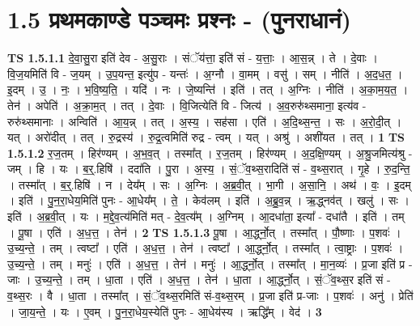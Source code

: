 \documentclass[17pt]{extarticle}
\begin{document}
\section*{ 1.5     प्रथमकाण्डे पञ्चमः प्रश्नः - (पुनराधानं) }
                                \textbf{ TS 1.5.1.1} \newline
                  दे॒वा॒सु॒रा इति॑ देव - अ॒सु॒राः । संॅय॑त्ता॒ इति॑ सं - य॒त्ताः॒ । आ॒स॒न्न् । ते । दे॒वाः । वि॒ज॒यमिति॑ वि - ज॒यम् । उ॒प॒यन्त॒ इत्यु॑प - यन्तः॑ । अ॒ग्नौ । वा॒मम् । वसु॑ । सम् । नीति॑ । अ॒द॒ध॒त॒ । इ॒दम् । उ॒ । नः॒ । भ॒वि॒ष्य॒ति॒ । यदि॑ । नः । जे॒ष्यन्ति॑ । इति॑ । तत् । अ॒ग्निः । नीति॑ । अ॒का॒म॒य॒त॒ । तेन॑ । अपेति॑ । अ॒क्रा॒म॒त् । तत् । दे॒वाः । वि॒जित्येति॑ वि - जित्य॑ । अ॒व॒रुरु॑थ्समाना॒ इत्य॑व - रुरु॑थ्समानाः । अन्विति॑ । आ॒य॒न्न् । तत् । अ॒स्य॒ । सह॑सा । एति॑ । अ॒दि॒थ्स॒न्त॒ । सः । अ॒रो॒दी॒त् । यत् । अरो॑दीत् । तत् । रु॒द्रस्य॑ । रु॒द्र॒त्वमिति॑ रुद्र - त्वम् । यत् । अश्रु॑ । अशी॑यत । तत् । \textbf{  1} \newline
                  \newline
                                \textbf{ TS 1.5.1.2} \newline
                  र॒ज॒तम् । हिर॑ण्यम् । अ॒भ॒व॒त् । तस्मा᳚त् । र॒ज॒तम् । हिर॑ण्यम् । अ॒द॒क्षि॒ण्यम् । अ॒श्रु॒जमित्य॑श्रु - जम् । हि । यः । ब॒र्॒.हिषि॑ । ददा॑ति । पु॒रा । अ॒स्य॒ । सं॒ॅव॒थ्स॒रादिति॑ सं - व॒थ्स॒रात् । गृ॒हे । रु॒द॒न्ति॒ । तस्मा᳚त् । ब॒र्॒.हिषि॑ । न । देय᳚म् । सः । अ॒ग्निः । अ॒ब्र॒वी॒त् । भा॒गी । अ॒सा॒नि॒ । अथ॑ । वः॒ । इ॒दम् । इति॑ । पु॒न॒रा॒धेय॒मिति॑ पुनः - आ॒धेय᳚म् । ते॒ । केव॑लम् । इति॑ । अ॒ब्रु॒व॒न्न् । ऋ॒द्ध्नव॑त् । खलु॑ । सः । इति॑ । अ॒ब्र॒वी॒त् । यः । म॒द्दे॒व॒त्य॑मिति॑ मत् - दे॒व॒त्य᳚म् । अ॒ग्निम् । आ॒दधा॑ता॒ इत्या᳚ - दधा॑तै । इति॑ । तम् । पू॒षा । एति॑ । अ॒ध॒त्त॒ । तेन॑ । \textbf{  2} \newline
                  \newline
                                \textbf{ TS 1.5.1.3} \newline
                  पू॒षा । आ॒र्द्ध्नो॒त् । तस्मा᳚त् । पौ॒ष्णाः । प॒शवः॑ । उ॒च्य॒न्ते॒ । तम् । त्वष्टा᳚ । एति॑ । अ॒ध॒त्त॒ । तेन॑ । त्वष्टा᳚ । आ॒र्द्ध्नो॒त् । तस्मा᳚त् । त्वा॒ष्ट्राः । प॒शवः॑ । उ॒च्य॒न्ते॒ । तम् । मनुः॑ । एति॑ । अ॒ध॒त्त॒ । तेन॑ । मनुः॑ । आ॒र्द्ध्नो॒त् । तस्मा᳚त् । मा॒न॒व्यः॑ । प्र॒जा इति॑ प्र - जाः । उ॒च्य॒न्ते॒ । तम् । धा॒ता । एति॑ । अ॒ध॒त्त॒ । तेन॑ । धा॒ता । आ॒र्द्ध्नो॒त् । सं॒ॅव॒थ्स॒र इति॑ सं - व॒थ्स॒रः । वै । धा॒ता । तस्मा᳚त् । सं॒ॅव॒थ्स॒रमिति॑ सं-व॒थ्स॒रम् । प्र॒जा इति॑ प्र-जाः । प॒शवः॑ । अनु॑ । प्रेति॑ । जा॒य॒न्ते॒ । यः । ए॒वम् । पु॒न॒रा॒धेय॒स्येति॑ पुनः - आ॒धेय॑स्य । ऋद्धि᳚म् । वेद॑ । \textbf{  3 } \newline
\end{document}
